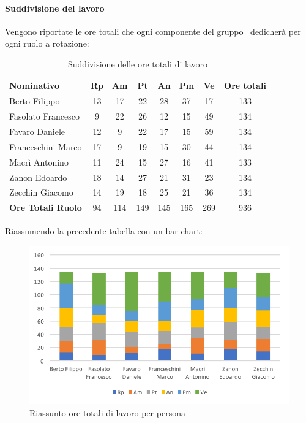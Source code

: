\documentclass[../PianoDiProgetto.tex]{subfiles}
\begin{document}
			\paragraph{Suddivisione del lavoro}
			Vengono riportate le ore totali che ogni componente del gruppo \kpanic\ dedicherà per ogni ruolo a rotazione:
			\begin{table}[h]
				\begin{tabularx}{\textwidth}{l * {6}{C} c}
				\toprule
				\textbf{Nominativo} & \textbf{Rp} & \textbf{Am} & \textbf{Pt} & \textbf{An} & \textbf{Pm} & \textbf{Ve} & \textbf{Ore totali} \\
				\midrule
				Berto Filippo &	13 & 17 & 22 & 28 & 37 & 17 & 133 \\
				Fasolato Francesco & 9 & 22 & 26 & 12 & 15 & 49 & 134 \\
				Favaro Daniele & 12 & 9 & 22 & 17 & 15 & 59 & 134 \\
				Franceschini Marco & 17 & 9 & 19 & 15 & 30 & 44 & 134 \\
				Macrì Antonino & 11 & 24 & 15 & 27 & 16 & 41 & 133 \\
				Zanon Edoardo &	18 & 14 & 27 & 21 & 31 & 23 & 134 \\
				Zecchin Giacomo & 14 & 19 & 18 & 25 & 21 & 36 & 134 \\
				\midrule			
				\textbf{Ore Totali Ruolo} & 94 & 114 & 149 & 145 & 165 & 269 & 936 \\
				\bottomrule
				\end{tabularx}
				\caption{Suddivisione delle ore totali di lavoro}		
			\end{table}

			Riassumendo la precedente tabella con un bar chart:
			\begin{figure}[!h]
				\centering
				\includegraphics[width=\textwidth]{Preventivo/Immagini/totale_oreRuoloPersona.png}
				\caption{Riassunto ore totali di lavoro per persona}
			\end{figure}	
			
\end{document}

